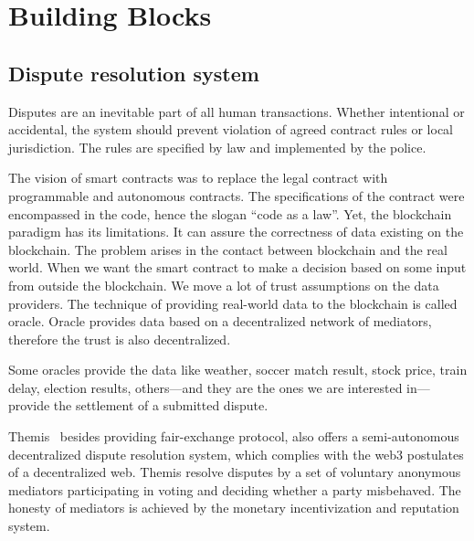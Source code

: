 \documentclass{ieeeaccess}
\begin{document}
\section{Building Blocks}\label{sec:building-blocks}
\subsection{Dispute resolution system}

Disputes are an inevitable part of all human transactions. Whether intentional or accidental, the system should prevent 
violation of  
agreed contract rules  or local jurisdiction. The rules are specified by law and implemented by the police.

The vision of smart contracts was to replace the legal contract with
programmable and autonomous contracts. The specifications of the contract
were encompassed in the code, hence the slogan ``code as a law''. Yet,
the blockchain paradigm has its limitations. It can assure the
correctness of data existing on the blockchain. The problem arises in
the contact between blockchain and the real world. When we want the smart
contract to make a decision based on some input from outside the
blockchain. We move a lot of trust assumptions on the data providers.
The technique of providing real-world data to the blockchain is called
oracle. Oracle provides data based on a decentralized network of mediators,
therefore the trust is also decentralized.

Some oracles provide the data like weather, soccer match result, stock
price, train delay, election results, others---and they are the ones we
are interested in---provide the settlement of a submitted dispute.


Themis~\cite{meng2019themis} besides providing fair-exchange protocol,
also offers a semi-autonomous decentralized dispute resolution system,
which complies with the web3 postulates of a decentralized web. Themis
resolve disputes by a set of voluntary anonymous mediators participating
in voting and deciding whether a party misbehaved. The honesty of
mediators is achieved by the monetary incentivization and reputation
system.
\end{document}

